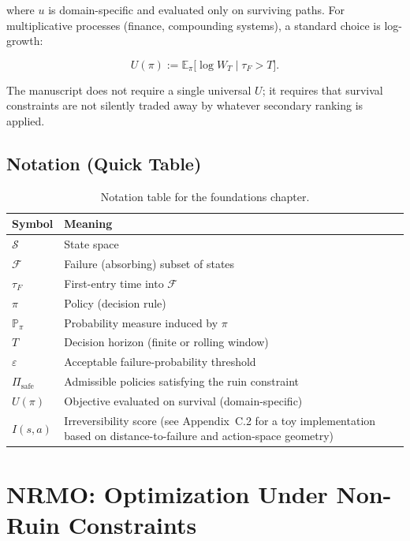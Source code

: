 where $u$ is domain-specific and evaluated only on surviving paths.
For multiplicative processes (finance, compounding systems), a
standard choice is log-growth:

\begin{equation}
U(\pi) := \mathbb{E}_\pi\bigl[\log W_T \mid \tau_F > T\bigr].
\label{eq:foundations-log-growth}
\end{equation}

The manuscript does not require a single universal $U$; it requires
that survival constraints are not silently traded away by whatever
secondary ranking is applied.

\subsection{Notation (Quick Table)}
\label{sec:foundations-2-5-notation}

\begin{table}[ht]
\centering
\small
\begin{tabularx}{\linewidth}{lX}
\toprule
\textbf{Symbol} & \textbf{Meaning} \\
\midrule
$\mathcal{S}$ & State space \\
$\mathcal{F}$ & Failure (absorbing) subset of states \\
$\tau_F$ & First-entry time into $\mathcal{F}$ \\
$\pi$ & Policy (decision rule) \\
$\mathbb{P}_\pi$ & Probability measure induced by $\pi$ \\
$T$ & Decision horizon (finite or rolling window) \\
$\varepsilon$ & Acceptable failure-probability threshold \\
$\Pi_{\mathrm{safe}}$ & Admissible policies satisfying the ruin
constraint \\
$U(\pi)$ & Objective evaluated on survival (domain-specific) \\
$I(s, a)$ & Irreversibility score (see
Appendix~C.2 for a toy implementation based on
distance-to-failure and action-space geometry) \\
\bottomrule
\end{tabularx}
\caption[Foundations notation]{Notation table for the foundations
chapter.}
\label{tab:foundations-notation}
\end{table}

\section{NRMO: Optimization Under Non-Ruin Constraints}
\label{sec:foundations-3-nrmo-optimization}

